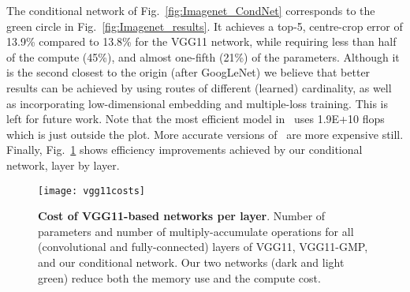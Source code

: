 \documentclass[thesis]{subfiles}
\begin{document}
The conditional network of Fig.~\ref{fig:Imagenet_CondNet} 
corresponds to the green circle in Fig.~\ref{fig:Imagenet_results}.
It achieves a top-5, centre-crop error of
13.9\% compared to 13.8\% for the VGG11 network, while requiring less than half of the compute (45\%),
 and almost one-fifth (21\%) of the parameters.
Although it is the second closest to the origin (after GoogLeNet) we believe that better results can be achieved 
by using routes of different (learned) cardinality, as well as incorporating low-dimensional embedding and multiple-loss training. This is left for future work. 
Note that the most efficient model in~\cite{He2015delving} uses 1.9E+10 flops which is just outside the plot. 
More accurate versions of~\cite{He2015delving} are more expensive still.
Finally, Fig.~\ref{fig:VggPerLayerCost} shows efficiency improvements achieved by our conditional network, layer by layer.

\begin{figure}[t]
\centerline{
\texttt{[image: vgg11costs]}
}
   \caption{{\bf Cost of VGG11-based networks per layer}. 
   Number of parameters and number of multiply-accumulate operations for all (convolutional and fully-connected) 
   layers of VGG11, VGG11-GMP, and our conditional network. Our two networks (dark and light green) 
   reduce both the memory use and the compute cost.}
\label{fig:VggPerLayerCost}
\end{figure}





\end{document}
